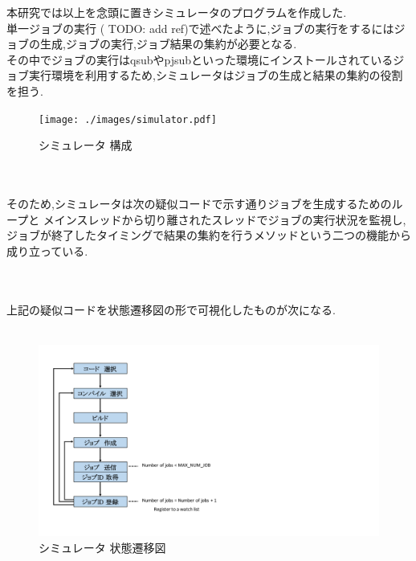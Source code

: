 本研究では以上を念頭に置きシミュレータのプログラムを作成した.\\
単一ジョブの実行 ( TODO: add ref)で述べたように,ジョブの実行をするにはジョブの生成,ジョブの実行,ジョブ結果の集約が必要となる.\\
その中でジョブの実行はqsubやpjsubといった環境にインストールされているジョブ実行環境を利用するため,シミュレータはジョブの生成と結果の集約の役割を担う.\\
\begin{figure}[htb]
  \begin{center}
    \texttt{[image: ./images/simulator.pdf]}
    \caption{シミュレータ 構成}
    \label{fig:simulator}
  \end{center}
\end{figure}~\\
~\\
そのため,シミュレータは次の疑似コードで示す通りジョブを生成するためのループと
メインスレッドから切り離されたスレッドでジョブの実行状況を監視し,
ジョブが終了したタイミングで結果の集約を行うメソッドという二つの機能から成り立っている.\\
~\\
{\footnotesize

}~\\
上記の疑似コードを状態遷移図の形で可視化したものが次になる.\\
~\\
\begin{figure}[htb]
  \begin{center}
    \includegraphics[width=20.0cm]{./images/state.pdf}
    \caption{シミュレータ 状態遷移図}
    \label{fig:simulator-state}
  \end{center}
\end{figure}~\\
